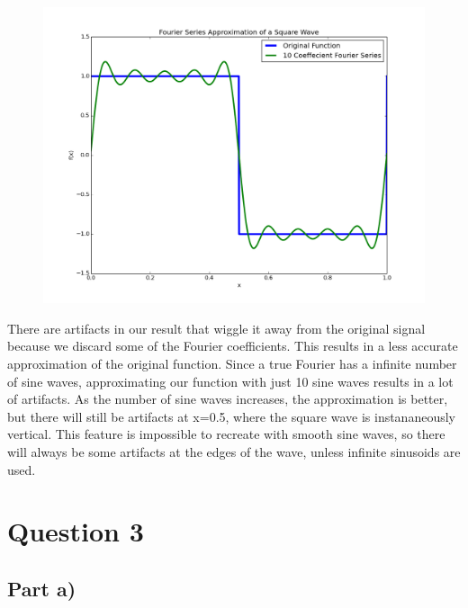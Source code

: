 \documentclass[a4paper,12pt]{article}
\begin{document}
\begin{figure}[H]
\centering
\includegraphics[width = \linewidth]{lab5q2.png}
\caption{}
\label{fig:q2}
\end{figure}

There are artifacts in our result that wiggle it away from the original signal because we discard some of the Fourier coefficients. This results in a less accurate approximation of the original function. Since a true Fourier has a infinite number of sine waves, approximating our function with just 10 sine waves results in a lot of artifacts. As the number of sine waves increases, the approximation is better, but there will still be artifacts at x=0.5, where the square wave is instananeously vertical. This feature is impossible to recreate with smooth sine waves, so there will always be some artifacts at the edges of the wave, unless infinite sinusoids are used.

\section{Question 3}

\subsection{Part a)}
\end{document}
